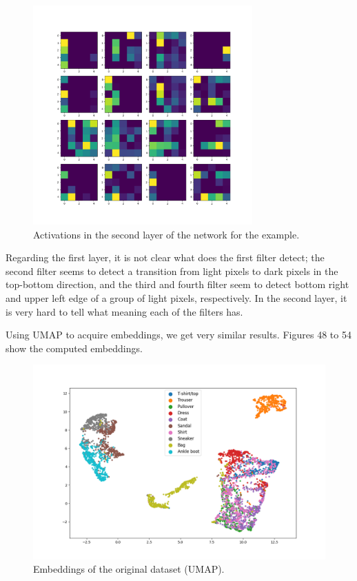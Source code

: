 \documentclass{article}
\begin{document}
\begin{figure}
  \centering
  \includegraphics[width=0.75\textwidth]{../../out/activations_cnn/fmnist/t-sne/filter_outputs/class0_l2.png}
    \caption{Activations in the second layer of the network for the example.}
\end{figure}

Regarding the first layer, it is not clear what does the first filter
detect; the second filter seems to detect a transition from light pixels
to dark pixels in the top-bottom direction, and the third and fourth
filter seem to detect bottom right and upper left edge of a group
of light pixels, respectively. In the second layer, it is very hard to tell what meaning
each of the filters has.

Using UMAP to acquire embeddings, we get very similar results. Figures 48
to 54 show the computed embeddings.

\begin{figure}
  \centering
    \includegraphics[width=1.0\textwidth]{../../out/activations_cnn/fmnist/umap/trained/plot_l0.png}
    \caption{Embeddings of the original dataset (UMAP).}
\end{figure}
\end{document}
